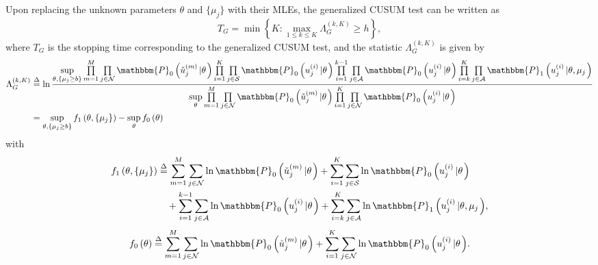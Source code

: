 \documentclass[11pt, draftclsnofoot, onecolumn]{IEEEtran}
\newcommand{\bbP}{\mathbbm{P}}
\begin{document}
Upon replacing the unknown parameters $\theta$ and $\{\mu_j\}$ with their MLEs, the generalized CUSUM test can be written as
\begin{equation} \label{GCUSUM_define}
{T_G} = \min \left\{ {K:\mathop {\max }\limits_{1 \le k \le K} \Lambda _G^{(k,K)} \ge h} \right\},
\end{equation}
where $T_G$ is the stopping time corresponding to the generalized CUSUM test, and the statistic $\Lambda _G^{(k,K)} $ is given by
\begin{align} \notag
\Lambda _G^{(k,K)} & \buildrel \Delta \over = \ln \frac{{\mathop {\sup }\limits_{\theta ,\{ {\mu _j} \ge b\} } \prod\limits_{m = 1}^M {\prod\limits_{j \in {\cal N}} {{\bbP_0}\left( {{\check{u}}_j^{(m)}\left| \theta  \right.} \right)} } \prod\limits_{i = 1}^K {\prod\limits_{j \in {\cal S}} {{\bbP_0}\left( {u_j^{(i)}\left| \theta  \right.} \right)} } \prod\limits_{i = 1}^{k - 1} {\prod\limits_{j \in {\cal A}} {{\bbP_0}\left( {u_j^{(i)}\left| \theta  \right.} \right)} } \prod\limits_{i = k}^K {\prod\limits_{j \in {\cal A}} {{\bbP_1}\left( {u_j^{(i)}\left| {\theta ,{\mu _j}} \right.} \right)} } }}{{\mathop {\sup }\limits_\theta  \prod\limits_{m = 1}^M {\prod\limits_{j \in {\cal N}} {{\bbP_0}\left( {{\check{u}}_j^{(m)}\left| \theta  \right.} \right)} } \prod\limits_{i = 1}^K {\prod\limits_{j \in {\cal N}} {{\bbP_0}\left( {u_j^{(i)}\left| \theta  \right.} \right)} } }}\\ \label{GCUSUM_statistic}
&  = \mathop {\sup }\limits_{\theta ,\{ {\mu _j} \ge b\} } {f_1}\left( {\theta ,\{ {\mu _j}\} } \right) - \mathop {\sup }\limits_\theta  {f_0}\left( {\theta } \right)
\end{align}
  with  
\begin{align} \notag
{f_1}\left( {\theta ,\{ {\mu _j}\} } \right) & \buildrel \Delta \over = \sum\limits_{m = 1}^M {\sum\limits_{j \in {\cal N}} {\ln {\bbP_0}\left( {{\check{u}}_j^{(m)}\left| \theta  \right.} \right)} }  + \sum\limits_{i = 1}^K {\sum\limits_{j \in {\cal S}} {\ln {\bbP_0}\left( {u_j^{(i)}\left| \theta  \right.} \right)} } \\ \label{f1_define}
& \quad + \sum\limits_{i = 1}^{k - 1} {\sum\limits_{j \in {\cal A}} {\ln {\bbP_0}\left( {u_j^{(i)}\left| \theta  \right.} \right)} }  + \sum\limits_{i = k}^K {\sum\limits_{j \in {\cal A}} {\ln {\bbP_1}\left( {u_j^{(i)}\left| {\theta ,{\mu _j}} \right.} \right)} },
\end{align}
\begin{equation} \label{f0_define}
{f_0}\left( \theta  \right) \buildrel \Delta \over = \sum\limits_{m = 1}^M {\sum\limits_{j \in {\cal N}} {\ln {\bbP_0}\left( {{\check{u}}_j^{(m)}\left| \theta  \right.} \right)} }  + \sum\limits_{i = 1}^K {\sum\limits_{j \in {\cal N}} {\ln {\bbP_0}\left( {u_j^{(i)}\left| \theta  \right.} \right)} }.
\end{equation}
\end{document}

